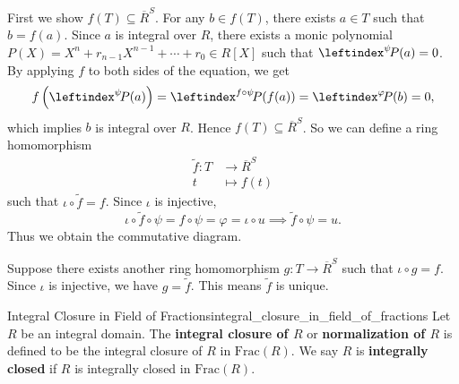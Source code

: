 \begin{prf}
    First we show $f(T)\subseteq \overline{R}^S$. For any $b\in f(T)$, there exists $a\in T$ such that $b=f(a)$. Since $a$ is integral over $R$, there exists a monic polynomial $P(X)=X^n+r_{n-1}X^{n-1}+\cdots+r_0\in R[X]$ such that $\leftindex^{\psi}\!P(a)=0$. By applying $f$ to both sides of the equation, we get
    \[
        f\left(\leftindex^{\psi}\!P(a)\right)=\leftindex^{f\circ \psi}\!P(f(a))=\leftindex^{\varphi}\!P(b)=0,
    \]
    which implies $b$ is integral over $R$. Hence $f(T)\subseteq \overline{R}^S$. So we can define a ring homomorphism
    \begin{align*}
        \widetilde{f}:T&\longrightarrow \overline{R}^S\\
        t&\longmapsto f(t)
    \end{align*}
   such that $\iota\circ \widetilde{f}=f$. Since $\iota$ is injective,
   \[
   \iota\circ \widetilde{f}\circ \psi=f\circ \psi=\varphi=\iota\circ u\implies \widetilde{f}\circ \psi=u.
   \]
   Thus we obtain the commutative diagram.

   Suppose there exists another ring homomorphism $g:T\to \overline{R}^S$ such that $\iota\circ g=f$. Since $\iota$ is injective, we have $g=\widetilde{f}$. This means $\widetilde{f}$ is unique.
\end{prf}
   

\begin{definition}{Integral Closure in Field of Fractions}{integral_closure_in_field_of_fractions}
    Let $R$ be an integral domain. The \textbf{integral closure of $R$} or \textbf{normalization of $R$} is defined to be the integral closure of $R$ in $\mathrm{Frac}(R)$. We say $R$ is \textbf{integrally closed} if $R$ is integrally closed in $\mathrm{Frac}(R)$.
\end{definition}

